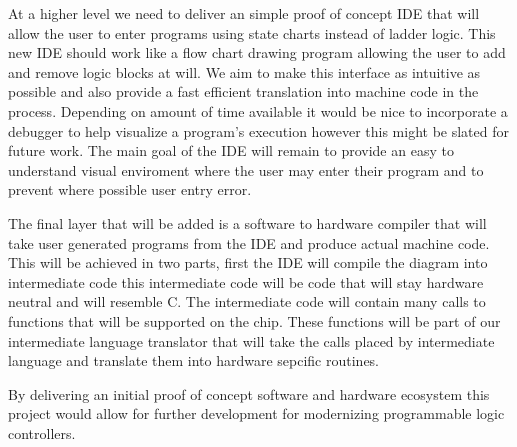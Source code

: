 At a higher level we need to deliver an simple proof of concept IDE that will allow the user to enter programs using state charts instead of ladder logic. This new IDE should work like a flow chart drawing program allowing the user to add and remove logic blocks at will. We aim to make this interface as intuitive as possible and also provide a fast efficient translation into machine code in the process. Depending on amount of time available it would be nice to incorporate a debugger to help visualize a program's execution however this might be slated for future work. The main goal of the IDE will remain to provide an easy to understand visual enviroment where the user may enter their program and to prevent where possible user entry error.

The final layer that will be added is a software to hardware compiler that will take user generated programs from the IDE and produce actual machine code. This will be achieved in two parts, first the IDE will compile the diagram into intermediate code this intermediate code will be code that will stay hardware neutral and will resemble C. The intermediate code will contain many calls to functions that will be supported on the chip. These functions will be part of our intermediate language translator that will take the calls placed by intermediate language and translate them into hardware sepcific routines.

By delivering an initial proof of concept software and hardware ecosystem this project would allow for further development for modernizing programmable logic controllers.


